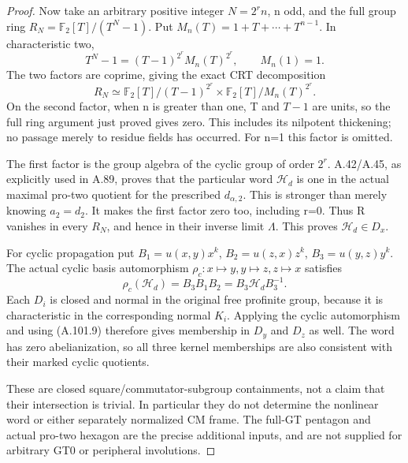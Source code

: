 \begin{proof}
Now take an arbitrary positive integer \(N=2^r n\), n odd, and
the full group ring \(R_N=\mathbb F_2[T]/(T^N-1)\). Put
\(M_n(T)=1+T+\cdots+T^{n-1}\). In characteristic two,
\[
 T^N-1=(T-1)^{2^r}M_n(T)^{2^r},\qquad M_n(1)=1.
 \tag{A.101.7}
\]
The two factors are coprime, giving the exact CRT decomposition
\[
 R_N\simeq\mathbb F_2[T]/(T-1)^{2^r}
       \times\mathbb F_2[T]/M_n(T)^{2^r}.
 \tag{A.101.8}
\]
On the second factor, when n is greater than one, T and \(T-1\) are
units, so the full ring argument just proved gives zero. This
includes its nilpotent thickening; no passage merely to residue
fields has occurred. For n=1 this factor is omitted.

The first factor is the group algebra of the cyclic group of order
\(2^r\). A.42/A.45, as explicitly used in A.89, proves that the
particular word \(\mathcal H_d\) is one in the actual maximal
pro-two quotient for the prescribed \(d_{\alpha,2}\). This is
stronger than merely knowing \(a_2=d_2\). It makes the first
factor zero too, including r=0. Thus R vanishes in every \(R_N\),
and hence in their inverse limit \(\Lambda\). This proves
\(\mathcal H_d\in D_x\).

For cyclic propagation put
\(B_1=u(x,y)x^k\), \(B_2=u(z,x)z^k\),
\(B_3=u(y,z)y^k\). The actual cyclic basis automorphism
\(\rho_c:x\mapsto y,y\mapsto z,z\mapsto x\) satisfies
\[
 \rho_c(\mathcal H_d)=B_3B_1B_2
                       =B_3\mathcal H_dB_3^{-1}.
 \tag{A.101.9}
\]
Each \(D_i\) is closed and normal in the original free profinite group,
because it is characteristic in the corresponding normal \(K_i\).
Applying the cyclic automorphism and using (A.101.9) therefore
gives membership in \(D_y\) and \(D_z\) as well. The word has zero
abelianization, so all three kernel memberships are also consistent
with their marked cyclic quotients.

These are closed square/commutator-subgroup containments, not a
claim that their intersection is trivial. In particular they do
not determine the nonlinear word or either separately normalized
CM frame. The full-GT pentagon and actual pro-two hexagon are the
precise additional inputs, and are not supplied for arbitrary GT0
or peripheral involutions.
\end{proof}
